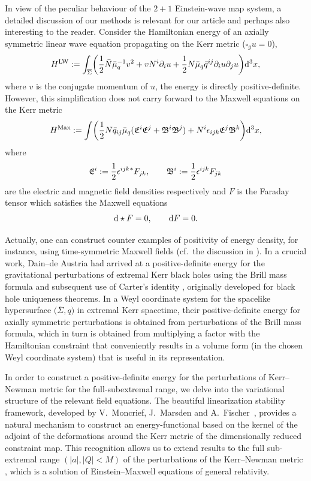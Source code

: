 \documentclass[pdftex]{sigma}
\def\eps{\epsilon}%
\def\ptl{\partial}%
\def\olin#1{\overline{#1}{}}%
\newcommand{\leftexp}[2]{{\vphantom{#2}}^{#1}{#2}}
\def\halb{\frac{1}{2}}%
\numberwithin{equation}{section}
\begin{document}
In view of the peculiar behaviour of the $2 + 1$ Einstein-wave map system, a detailed discussion of our methods is relevant for our article and perhaps also interesting to the reader. Consider the Hamiltonian energy of an axially symmetric linear wave equation propagating on the Kerr metric ($\square_g u =0$),
\begin{align*}
H^{\text{LW}} := \int_{\olin{\Sigma}} \biggl(\halb \bar{N}\bar{\mu}^{-1}_q v^2 + vN^i \ptl_i u+ \halb N \bar{\mu}_q \bar{q}^{ij} \ptl_i u \ptl_j u \biggr) {\rm d}^3 x,
\end{align*}
where $v$ is the conjugate momentum of $u$, the energy is directly positive-definite.
However, this simplification does not carry forward to the Maxwell equations on the Kerr metric
\[
H^{{\rm Max}} := \int \biggl(\halb N \bar{q}_{ij} \bar{\mu}_q (\mathfrak{E}^i \mathfrak{E}^j + \mathfrak{B}^i \mathfrak{B}^j) + N^i \eps_{ijk}\mathfrak{E}^j \mathfrak{B}^k \biggr) {\rm d}^3 x,
\]
where
\[
\mathfrak{E}^i := \halb \eps^{ijk} \leftexp{*}F_{jk}, \qquad
\mathfrak{B}^i := \halb \eps^{ijk} F_{jk}
\]
are the electric and magnetic field densities respectively and $F$ is the Faraday tensor which satisfies the Maxwell equations
\begin{align*}
 {\rm d} \star F =0, \qquad {\rm d} F =0.
\end{align*}

Actually, one can construct counter examples of positivity of energy density, for instance, using time-symmetric Maxwell fields (cf.\ the discussion in \cite[Section 2]{GM17_gentitle}). In a crucial work, Dain--de Austria \cite{DA_14} had arrived at a positive-definite energy for the gravitational perturbations of extremal Kerr black holes using the Brill mass formula \cite{D09} and subsequent use of Carter's identity \cite{Car_71}, originally developed for black hole uniqueness theorems. In a Weyl coordinate system for the spacelike hypersurface $\bigl(\olin{\Sigma}, q\bigr)$ in extremal Kerr spacetime, their positive-definite energy for axially symmetric perturbations is obtained
from perturbations of the Brill mass formula, which in turn is obtained from multiplying a factor with the Hamiltonian constraint that conveniently results in a volume form (in the chosen Weyl coordinate system) that is useful in its representation.

In order to construct a positive-definite energy for the perturbations of Kerr--Newman metric for the full-subextremal range, we delve into the variational structure of the relevant field equations. The beautiful linearization stability framework, developed by V.~Moncrief, J.~Marsden and A.~Fischer~\cite{FM_75,FMM_80,Mon_75}, provides a
natural mechanism to construct an energy-functional based on the kernel of the adjoint of the deformations around the Kerr metric of the dimensionally reduced constraint map. This recognition allows us to extend results to the full sub-extremal range $(\vert a \vert, \vert Q \vert <M)$ of the perturbations of the Kerr--Newman metric \cite{GM17_gentitle}, which is a solution of Einstein--Maxwell equations of general relativity.
\end{document}
